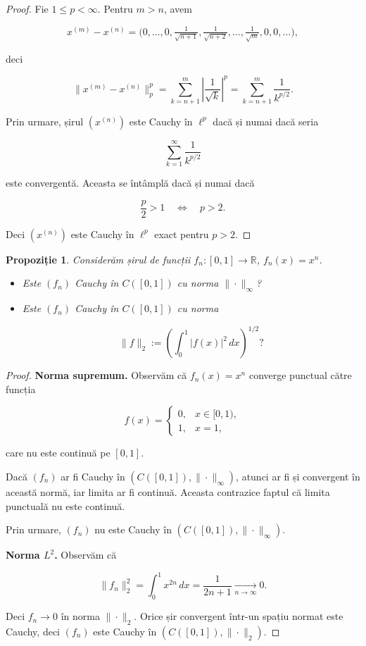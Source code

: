 \documentclass[12pt]{article}
\theoremstyle{definition}
\theoremstyle{plain}
\newtheorem{proposition}{Propoziție}
\begin{document}
\begin{proof}
Fie $1 \le p < \infty$. Pentru $m>n$, avem


\[
x^{(m)} - x^{(n)} = \bigl(0,\dots,0,\tfrac{1}{\sqrt{n+1}},\tfrac{1}{\sqrt{n+2}},\dots,\tfrac{1}{\sqrt{m}},0,0,\dots\bigr),
\]


deci


\[
\|x^{(m)} - x^{(n)}\|_p^p
= \sum_{k=n+1}^m \left|\frac{1}{\sqrt{k}}\right|^p
= \sum_{k=n+1}^m \frac{1}{k^{p/2}}.
\]


Prin urmare, șirul $(x^{(n)})$ este Cauchy în $\ell^p$ dacă și numai dacă seria


\[
\sum_{k=1}^\infty \frac{1}{k^{p/2}}
\]


este convergentă. Aceasta se întâmplă dacă și numai dacă


\[
\frac{p}{2} > 1 \quad \Longleftrightarrow \quad p > 2.
\]


Deci $(x^{(n)})$ este Cauchy în $\ell^p$ exact pentru $p>2$.
\end{proof}

\begin{proposition}
Considerăm șirul de funcții $f_n : [0,1] \to \mathbb{R}$, $f_n(x) = x^n$.
\begin{itemize}
  \item Este $(f_n)$ Cauchy în $C([0,1])$ cu norma $\|\cdot\|_\infty$?
  \item Este $(f_n)$ Cauchy în $C([0,1])$ cu norma
  

\[
  \|f\|_2 := \left( \int_0^1 |f(x)|^2\,dx \right)^{1/2}?
  \]


\end{itemize}
\end{proposition}

\begin{proof}
\textbf{Norma supremum.}
Observăm că $f_n(x)=x^n$ converge punctual către funcția


\[
f(x)=
\begin{cases}
0, & x\in[0,1),\\
1, & x=1,
\end{cases}
\]


care nu este continuă pe $[0,1]$.

Dacă $(f_n)$ ar fi Cauchy în $(C([0,1]),\|\cdot\|_\infty)$, atunci ar fi și convergent în această normă, iar limita ar fi continuă. Aceasta contrazice faptul că limita punctuală nu este continuă.

Prin urmare, $(f_n)$ nu este Cauchy în $(C([0,1]),\|\cdot\|_\infty)$.

\medskip

\textbf{Norma $L^2$.} Observăm că


\[
\|f_n\|_2^2 = \int_0^1 x^{2n}\,dx = \frac{1}{2n+1} \xrightarrow[n\to\infty]{} 0.
\]


Deci $f_n \to 0$ în norma $\|\cdot\|_2$. Orice șir convergent într-un spațiu normat este Cauchy, deci $(f_n)$ este Cauchy în $(C([0,1]),\|\cdot\|_2)$.
\end{proof}
\end{document}
